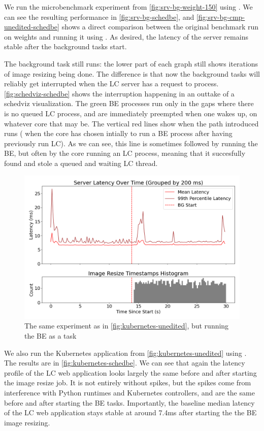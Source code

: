 We run the microbenchmark experiment from \autoref{fig:srv-bg-weight-150} using
\schedbe{}. We can see the resulting performance in
\autoref{fig:srv-bg-schedbe}, and \autoref{fig:srv-bg-cmp-unedited-schedbe}
shows a direct comparison between the original benchmark run on \cgroups{}
weights and running it using \schedbe{}. As desired, the latency of the server
remains stable after the background tasks start. 

The background task still runs: the lower part of each graph still shows
iterations of image resizing being done. The difference is that now the
background tasks will reliably get interrupted when the LC server has a request
to process. \autoref{fig:schedviz-schedbe} shows the interruption happening in
an outtake of a schedviz visualization. The green BE processes run only in the
gaps where there is no queued LC process, and are immediately preempted when one
wakes up, on whatever core that may be. The vertical red lines show when the
\exit{} path \schedbe{} introduced runs (\ie{} when the core has chosen intially
to run a BE process after having previously run LC). As we can see, this line is
sometimes followed by running the BE, but often by the core running an LC
process, meaning that it succesfully found and stole a queued and waiting LC
thread.

\begin{figure}[t]
    \centering
    \includegraphics[width=\columnwidth]{graphs/kubernetes-schedbe.png}
    \caption{The same experiment as in \autoref{fig:kubernetes-unedited}, but
    running the BE as a \schedbe{} task}\label{fig:kubernetes-schedbe}
\end{figure}

We also run the Kubernetes application from \autoref{fig:kubernetes-unedited}
using \schedbe{}. The results are in \autoref{fig:kubernetes-schedbe}. We can
see that again the latency profile of the LC web application looks largely the
same before and after starting the image resize job. It is not entirely without spikes, but the spikes come
from interference with Python runtimes and Kubernetes controllers, and are the
same before and after starting the BE tasks. Importantly, the baseline median
latency of the LC web application stays stable at around 7.4ms after starting
the the BE image resizing. 

